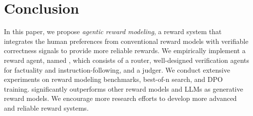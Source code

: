\section{Conclusion}

In this paper, we propose \textit{agentic reward modeling}, a reward system that integrates the human preferences from conventional reward models with verifiable correctness signals to provide more reliable rewards. We empirically implement a reward agent, named \ourmethod, which consists of a router, well-designed verification agents for factuality and instruction-following, and a judger. We conduct extensive experiments on reward modeling benchmarks, best-of-n search, and DPO training. \ourmethod significantly outperforms other reward models and LLMs as generative reward models. We encourage more research efforts to develop more advanced and reliable reward systems.